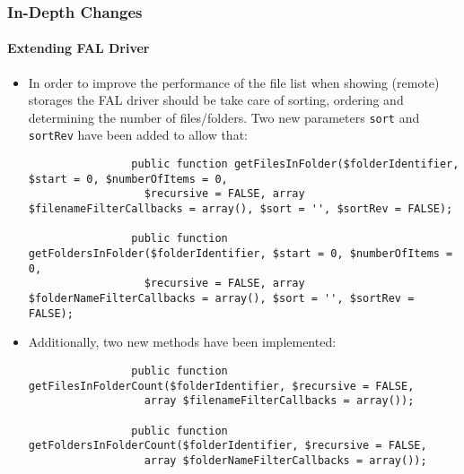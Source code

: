 \begin{frame}[fragile]
	\frametitle{In-Depth Changes}
	\framesubtitle{Extending FAL Driver}

	\lstset{basicstyle=\tiny\ttfamily}

	\begin{itemize}
		\item In order to improve the performance of the file list when showing (remote) storages
			the FAL driver should be take care of sorting, ordering and determining the number
			of files/folders. Two new parameters \texttt{sort} and \texttt{sortRev} have been
			added to allow that:

			\begin{lstlisting}
				public function getFilesInFolder($folderIdentifier, $start = 0, $numberOfItems = 0,
				  $recursive = FALSE, array $filenameFilterCallbacks = array(), $sort = '', $sortRev = FALSE);

				public function getFoldersInFolder($folderIdentifier, $start = 0, $numberOfItems = 0,
				  $recursive = FALSE, array $folderNameFilterCallbacks = array(), $sort = '', $sortRev = FALSE);
			\end{lstlisting}

		\item Additionally, two new methods have been implemented:

			\begin{lstlisting}
				public function getFilesInFolderCount($folderIdentifier, $recursive = FALSE,
				  array $filenameFilterCallbacks = array());

				public function getFoldersInFolderCount($folderIdentifier, $recursive = FALSE,
				  array $folderNameFilterCallbacks = array());
			\end{lstlisting}

	\end{itemize}

\end{frame}

